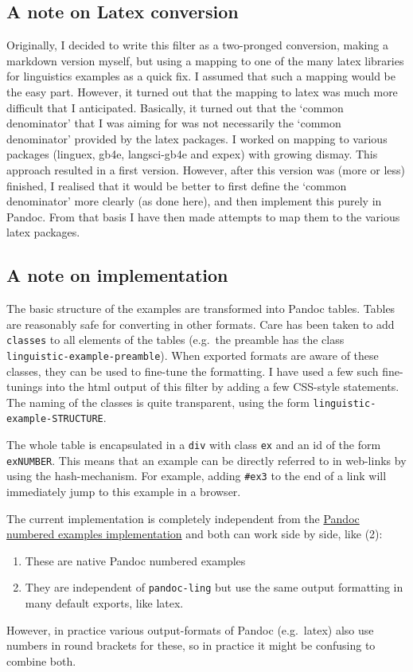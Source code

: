 \documentclass[
]{article}
\begin{document}
\subsection{A note on Latex
conversion}\label{a-note-on-latex-conversion}

Originally, I decided to write this filter as a two-pronged conversion,
making a markdown version myself, but using a mapping to one of the many
latex libraries for linguistics examples as a quick fix. I assumed that
such a mapping would be the easy part. However, it turned out that the
mapping to latex was much more difficult that I anticipated. Basically,
it turned out that the `common denominator' that I was aiming for was
not necessarily the `common denominator' provided by the latex packages.
I worked on mapping to various packages (linguex, gb4e, langsci-gb4e and
expex) with growing dismay. This approach resulted in a first version.
However, after this version was (more or less) finished, I realised that
it would be better to first define the `common denominator' more clearly
(as done here), and then implement this purely in Pandoc. From that
basis I have then made attempts to map them to the various latex
packages.

\subsection{A note on implementation}\label{a-note-on-implementation}

The basic structure of the examples are transformed into Pandoc tables.
Tables are reasonably safe for converting in other formats. Care has
been taken to add \texttt{classes} to all elements of the tables
(e.g.~the preamble has the class \texttt{linguistic-example-preamble}).
When exported formats are aware of these classes, they can be used to
fine-tune the formatting. I have used a few such fine-tunings into the
html output of this filter by adding a few CSS-style statements. The
naming of the classes is quite transparent, using the form
\texttt{linguistic-example-STRUCTURE}.

The whole table is encapsulated in a \texttt{div} with class \texttt{ex}
and an id of the form \texttt{exNUMBER}. This means that an example can
be directly referred to in web-links by using the hash-mechanism. For
example, adding \texttt{\#ex3} to the end of a link will immediately
jump to this example in a browser.

The current implementation is completely independent from the
\href{https://pandoc.org/MANUAL.html\#numbered-example-lists}{Pandoc
numbered examples implementation} and both can work side by side, like
(2):

\begin{enumerate}
\def\labelenumi{(\arabic{enumi})}
\item
  These are native Pandoc numbered examples
\item
  They are independent of \texttt{pandoc-ling} but use the same output
  formatting in many default exports, like latex.
\end{enumerate}

However, in practice various output-formats of Pandoc (e.g.~latex) also
use numbers in round brackets for these, so in practice it might be
confusing to combine both.
\end{document}
